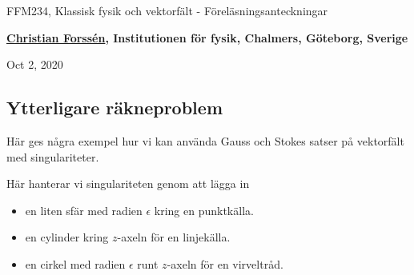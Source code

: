 \documentclass[%
oneside,                 %
final,                   %
10pt]{article}
\begin{document}

\newcommand{\exercisesection}[1]{\subsection*{#1}}







\thispagestyle{empty}

\begin{center}
{\LARGE\bf
\begin{spacing}{1.25}
FFM234, Klassisk fysik och vektorfält - Föreläsningsanteckningar
\end{spacing}
}
\end{center}


\begin{center}
{\bf \href{{http://fy.chalmers.se/subatom/tsp/}}{Christian Forssén}, Institutionen för fysik, Chalmers, Göteborg, Sverige${}^{}$} \\ [0mm]
\end{center}

\begin{center}
\end{center}
    

\begin{center}
Oct 2, 2020
\end{center}

\vspace{1cm}


\subsection*{Ytterligare räkneproblem}

Här ges några exempel hur vi kan använda Gauss och Stokes satser på vektorfält med singulariteter. 

Här hanterar vi singulariteten genom att lägga in 
\begin{itemize}
\item en liten sfär med radien $\epsilon$ kring en punktkälla.

\item en cylinder kring $z$-axeln för en linjekälla.

\item en cirkel med radien $\epsilon$ runt $z$-axeln för en virveltråd.
\end{itemize}
\end{document}
